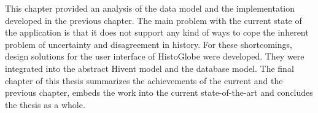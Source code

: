 



\vspace{2em}

This chapter provided an analysis of the data model and the implementation developed in the previous chapter. The main problem with the current state of the application is that it does not support any kind of ways to cope the inherent problem of uncertainty and disagreement in history. For these shortcomings, design solutions for the user interface of HistoGlobe were developed. They were integrated into the abstract Hivent model and the database model. The final chapter of this thesis summarizes the achievements of the current and the previous chapter, embeds the work into the current state-of-the-art and concludes the thesis as a whole.